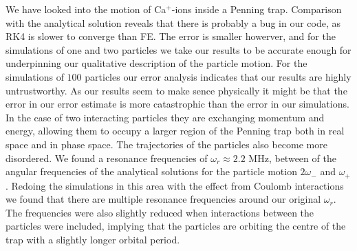 We have looked into the motion of Ca$^+$-ions inside a Penning trap. Comparison
with the analytical solution reveals that there is probably a bug in our code, as RK4 is slower to converge
than FE. The error is smaller howerver, and for the simulations of one and two particles we take
our results to be accurate enough for underpinning our qualitative description of the particle motion.
For the simulations of $100$ particles our error analysis indicates that our results are highly untrustworthy. As our results seem to make sence physically it might be that the error in our error estimate is more catastrophic than the error in our simulations.
In the case of two interacting particles they are exchanging momentum and energy, allowing them to
occupy a larger region of the Penning trap both in real space and in phase space. The trajectories of the
particles also become more disordered.
We found a resonance frequencies of $\omega_r \approx 2.2$ MHz, between of the angular frequencies of
the analytical solutions for the particle motion $2\omega_{-}$ and $\omega_{+}$. Redoing the simulations
in this area with the effect from Coulomb interactions we found
that there are multiple resonance frequencies around our original $\omega_r$. The frequencies were also
slightly reduced when interactions between the particles were included, implying that the particles
are orbiting the centre of the trap with a slightly longer orbital period.
